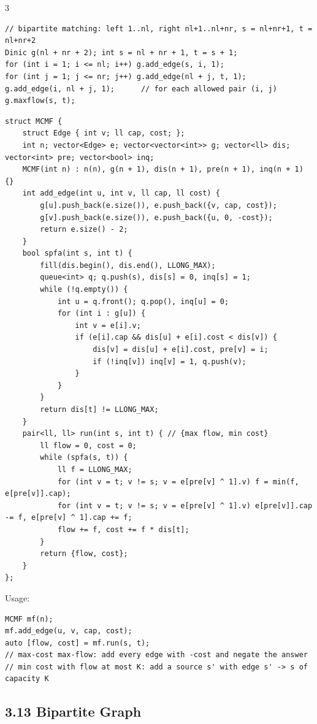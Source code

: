 \documentclass[8pt]{extarticle}
\begin{document}
\begin{multicols*}{3}
\begin{lstlisting}
// bipartite matching: left 1..nl, right nl+1..nl+nr, s = nl+nr+1, t = nl+nr+2
Dinic g(nl + nr + 2); int s = nl + nr + 1, t = s + 1;
for (int i = 1; i <= nl; i++) g.add_edge(s, i, 1);
for (int j = 1; j <= nr; j++) g.add_edge(nl + j, t, 1);
g.add_edge(i, nl + j, 1);      // for each allowed pair (i, j)
g.maxflow(s, t);
\end{lstlisting}

\begin{lstlisting}
struct MCMF {
    struct Edge { int v; ll cap, cost; };
    int n; vector<Edge> e; vector<vector<int>> g; vector<ll> dis; vector<int> pre; vector<bool> inq;
    MCMF(int n) : n(n), g(n + 1), dis(n + 1), pre(n + 1), inq(n + 1) {}
    int add_edge(int u, int v, ll cap, ll cost) {
        g[u].push_back(e.size()), e.push_back({v, cap, cost});
        g[v].push_back(e.size()), e.push_back({u, 0, -cost});
        return e.size() - 2;
    }
    bool spfa(int s, int t) {
        fill(dis.begin(), dis.end(), LLONG_MAX);
        queue<int> q; q.push(s), dis[s] = 0, inq[s] = 1;
        while (!q.empty()) {
            int u = q.front(); q.pop(), inq[u] = 0;
            for (int i : g[u]) {
                int v = e[i].v;
                if (e[i].cap && dis[u] + e[i].cost < dis[v]) {
                    dis[v] = dis[u] + e[i].cost, pre[v] = i;
                    if (!inq[v]) inq[v] = 1, q.push(v);
                }
            }
        }
        return dis[t] != LLONG_MAX;
    }
    pair<ll, ll> run(int s, int t) { // {max flow, min cost}
        ll flow = 0, cost = 0;
        while (spfa(s, t)) {
            ll f = LLONG_MAX;
            for (int v = t; v != s; v = e[pre[v] ^ 1].v) f = min(f, e[pre[v]].cap);
            for (int v = t; v != s; v = e[pre[v] ^ 1].v) e[pre[v]].cap -= f, e[pre[v] ^ 1].cap += f;
            flow += f, cost += f * dis[t];
        }
        return {flow, cost};
    }
};
\end{lstlisting}

Usage:

\begin{lstlisting}
MCMF mf(n);
mf.add_edge(u, v, cap, cost);
auto [flow, cost] = mf.run(s, t);
// max-cost max-flow: add every edge with -cost and negate the answer
// min cost with flow at most K: add a source s' with edge s' -> s of capacity K
\end{lstlisting}

\subsection*{3.13 Bipartite Graph}


\end{multicols*}
\end{document}

